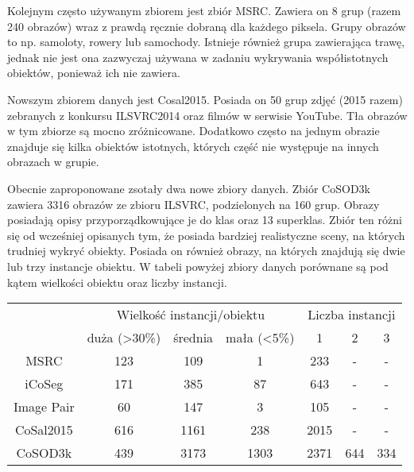 \documentclass[a4paper,12pt,twoside,openany]{report}
\begin{document}
	Kolejnym często używanym zbiorem jest zbiór MSRC. Zawiera on 8 grup (razem 240 obrazów) wraz z prawdą ręcznie dobraną dla każdego piksela. Grupy obrazów to np. samoloty, rowery lub samochody. Istnieje również grupa zawierająca trawę, jednak nie jest ona zazwyczaj używana w zadaniu wykrywania współistotnych obiektów, ponieważ ich nie zawiera.

	Nowszym zbiorem danych jest Cosal2015. Posiada on 50 grup zdjęć (2015 razem) zebranych z konkursu ILSVRC2014 oraz filmów w serwisie YouTube. Tła obrazów w tym zbiorze są mocno zróżnicowane. Dodatkowo często na jednym obrazie znajduje się kilka obiektów istotnych, których część nie występuje na innych obrazach w grupie.

	Obecnie zaproponowane zsotały dwa nowe zbiory danych. Zbiór CoSOD3k \cite{fan2020rethinking} zawiera 3316 obrazów ze zbioru ILSVRC, podzielonych na 160 grup. Obrazy posiadają opisy przyporządkowujące je do klas oraz 13 superklas. Zbiór ten różni się od wcześniej opisanych tym, że posiada bardziej realistyczne sceny, na których trudniej wykryć obiekty. Posiada on również obrazy, na których znajdują się dwie lub trzy instancje obiektu. W tabeli powyżej zbiory danych porównane są pod kątem wielkości obiektu oraz liczby instancji.

	\begin{table}[]
		\begin{tabular}{c||ccc||ccc}
		\hline
				   & \multicolumn{3}{c||}{Wielkość instancji/obiektu}             & \multicolumn{3}{c}{Liczba instancji} \\
				   & duża (\textgreater{}30\%) & średnia & mała (\textless{}5\%) & 1          & 2        & 3       \\ \hline
		MSRC       & 123                       & 109     & 1                     & 233        & -        & -        \\
		iCoSeg     & 171                       & 385     & 87                    & 643        & -        & -        \\
		Image Pair & 60                        & 147     & 3                     & 105        & -        & -        \\
		CoSal2015  & 616                       & 1161    & 238                   & 2015      & -        & -        \\ \hline \hline
		CoSOD3k    & 439                       & 3173    & 1303                  & 2371       & 644      & 334      \\ \hline
		\end{tabular}
	\end{table}
\end{document}

